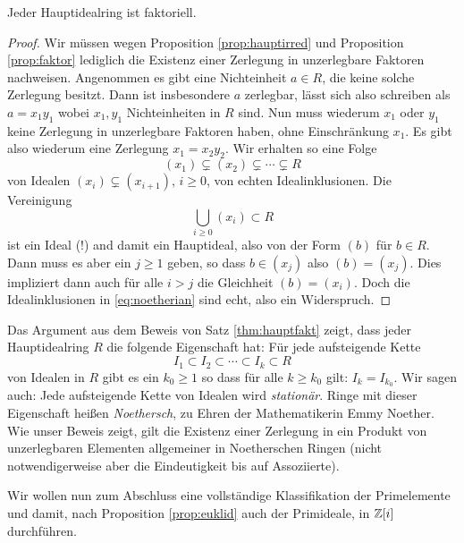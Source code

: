 \documentclass{book}
\begin{document}
\begin{thm}
    \label{thm:hauptfakt}
    Jeder Hauptidealring ist faktoriell.
\end{thm}
\begin{proof}
    Wir müssen wegen Proposition \ref{prop:hauptirred} und Proposition
    \ref{prop:faktor} lediglich die Existenz einer Zerlegung in unzerlegbare
    Faktoren nachweisen. Angenommen es gibt eine Nichteinheit $a \in R$, die
    keine solche Zerlegung besitzt. Dann ist insbesondere $a$ zerlegbar, lässt
    sich also schreiben als $a = x_1 y_1$ wobei $x_1,y_1$ Nichteinheiten in $R$
    sind. Nun muss wiederum $x_1$ oder $y_1$ keine Zerlegung in unzerlegbare
    Faktoren haben, ohne Einschränkung $x_1$. Es gibt also wiederum eine
    Zerlegung $x_1 = x_2 y _2$. Wir erhalten so eine Folge
    \begin{equation}
        \label{eq:noetherian}
        (x_1) \subsetneq (x_2) \subsetneq \cdots \subsetneq R
    \end{equation}
    von Idealen $(x_i) \subsetneq (x_{i+1})$, $i \ge 0$, von echten Idealinklusionen. Die Vereinigung 
    \[
        \bigcup_{i \ge 0} (x_i)  \subset R
    \]
    ist ein Ideal (!) and damit ein Hauptideal, also von der Form $(b)$ für $b \in
    R$. Dann muss es aber ein $j \ge 1$ geben, so dass $b \in (x_j)$ also $(b)
    = (x_j)$. Dies impliziert dann auch für alle $i >j$ die Gleichheit
    $(b) = (x_i)$. Doch die Idealinklusionen in \eqref{eq:noetherian} sind
    echt, also ein Widerspruch.
\end{proof}

\begin{rem}
    \label{rem:noether}
    Das Argument aus dem Beweis von Satz \ref{thm:hauptfakt} zeigt,
    dass jeder Hauptidealring $R$ die folgende Eigenschaft hat:
    Für jede aufsteigende Kette
    \[
        I_1 \subset I_2 \subset \cdots \subset I_k \subset  R
    \]
    von Idealen in $R$ gibt es ein $k_0 \ge 1$ so dass für alle $k \ge k_0$
    gilt: $I_k = I_{k_0}$. Wir sagen auch: Jede aufsteigende Kette von Idealen
    wird \emph{stationär}. Ringe mit dieser Eigenschaft heißen
    \emph{Noethersch}, zu Ehren der Mathematikerin Emmy Noether. Wie unser
    Beweis zeigt, gilt die Existenz einer Zerlegung in ein Produkt von unzerlegbaren
    Elementen allgemeiner in Noetherschen Ringen (nicht notwendigerweise aber
    die Eindeutigkeit bis auf Assoziierte). 
\end{rem}

Wir wollen nun zum Abschluss eine vollständige Klassifikation der Primelemente
und damit, nach Proposition \ref{prop:euklid} auch der Primideale, in $\mathbb{Z}[i]$
durchführen.
\end{document}
